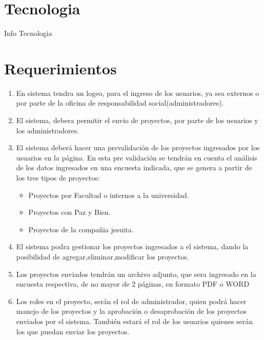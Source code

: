 \documentclass[journal]{IEEEtran}
\begin{document}
\begin{tabbing}
\hspace*{1cm} 
\end{tabbing}

\section{\textbf{Tecnologia}}
Info Tecnologia
\section{\textbf{Requerimientos}}

\begin{enumerate}
\item
En sistema tendra un logeo, para el ingreso de los usuarios, ya sea externos o por parte de la oficina de responsabilidad social(administradores).\\
\item
El sistema, debera permitir el envio de proyectos, por parte de los usuarios y los administradores.\\
\item
El sistema deberá hacer una prevalidaci\'on de los proyectos ingresados
por los usuarios en la p\'agina. En esta pre validaci\'on se tendr\'an en
cuenta el an\'alisis de los datos ingresados en una encuesta indicada, que se genera a partir de los tres tipos de proyectos:
\begin{itemize}
\item
Proyectos por Facultad o internos a la universidad.
\item
Proyectos con Paz y Bien.
\item
Proyectos de la compa\~nia jesuita.\\
\end{itemize}
\item
El sistema podra gestionar los proyectos ingresados a el sistema, dando la posibilidad de agregar,eliminar,modificar los proyectos.\\
\item
Los proyectos enviados tendrán un archivo adjunto, que sera ingresado en la encuesta respectiva, de no mayor de 2 páginas, en formato PDF o WORD\\
\item
Los roles en el proyecto, serán el rol de administrador, quien podrá
hacer manejo de los proyectos y la aprobación o desaprobación de
los proyectos enviados por el sistema. También estará el rol de los
usuarios quienes serán los que puedan enviar los proyectos.\\

\end{enumerate}
\end{document}
